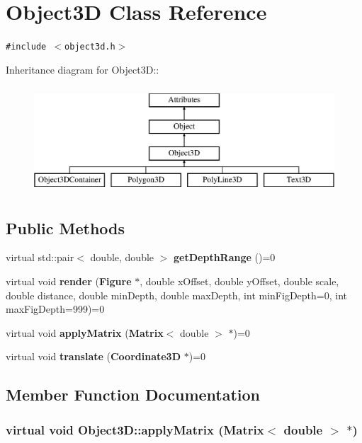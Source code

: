 \section{Object3D Class Reference}
\label{classObject3D}
{\tt \#include $<$object3d.h$>$}

Inheritance diagram for Object3D::\begin{figure}[H]
\begin{center}
\leavevmode
\includegraphics[height=4cm]{classObject3D}
\end{center}
\end{figure}
\subsection*{Public Methods}
\begin{CompactItemize}
\item 
virtual std::pair$<$ double, double $>$ {\bf get\-Depth\-Range} ()=0
\item 
virtual void {\bf render} ({\bf Figure} $\ast$, double x\-Offset, double y\-Offset, double scale, double distance, double min\-Depth, double max\-Depth, int min\-Fig\-Depth=0, int max\-Fig\-Depth=999)=0
\item 
virtual void {\bf apply\-Matrix} ({\bf Matrix}$<$ double $>$ $\ast$)=0
\item 
virtual void {\bf translate} ({\bf Coordinate3D} $\ast$)=0
\end{CompactItemize}


\subsection{Member Function Documentation}
\subsubsection{\setlength{\rightskip}{0pt plus 5cm}virtual void Object3D::apply\-Matrix ({\bf Matrix}$<$ double $>$ $\ast$)\hspace{0.3cm}{\tt  [pure virtual]}}\label{classObject3D_a2}




